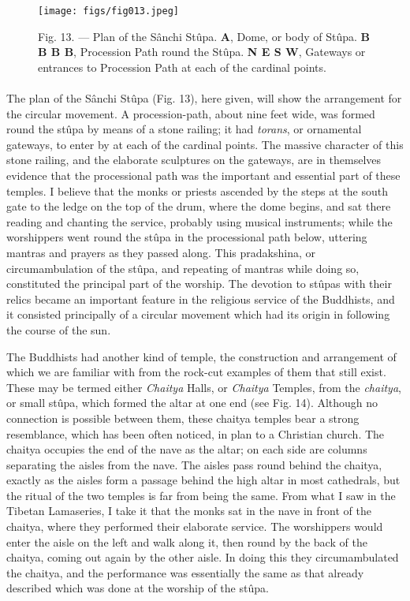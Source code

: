 \documentclass[a4paper, 11pt, oneside, polutonikogreek, english]{article}
\begin{document}
\begin{figure}[H]
\centering
\texttt{[image: figs/fig013.jpeg]}
\caption[Fig. 13. --- Plan of the Sânchi Stûpa.]{Fig. 13. --- Plan of the Sânchi Stûpa. \textbf{A}, Dome, or body of Stûpa. \textbf{B B B B}, Procession Path round the Stûpa. \textbf{N E S W}, Gateways or entrances to Procession Path at each of the cardinal points.}
\end{figure}
\paragraph{}
The plan of the Sânchi Stûpa (Fig. 13), here given, will show the arrangement for the circular movement. A procession-path, about nine feet wide, was formed round the stûpa by means of a stone railing; it had \emph{torans}, or ornamental gateways, to enter by at each of the cardinal points. The massive character of this stone railing, and the elaborate sculptures on the gateways, are in themselves evidence that the processional path was the important and essential part of these temples. I believe that the monks or priests ascended by the steps at the south gate to the ledge on the top of the drum, where the dome begins, and sat there reading and chanting the service, probably using musical instruments; while the worshippers went round the stûpa in the processional path below, uttering mantras and prayers as they passed along. This pradakshina, or circumambulation of the stûpa, and repeating of mantras while doing so, constituted the principal part of the worship. The devotion to stûpas with their relics became an important feature in the religious service of the Buddhists, and it consisted principally of a circular movement which had its origin in following the course of the sun.

The Buddhists had another kind of temple, the construction and arrangement of which we are familiar with from the rock-cut examples of them that still exist. These may be termed either \emph{Chaitya} Halls, or \emph{Chaitya} Temples, from the \emph{chaitya}, or small stûpa, which formed the altar at one end (see Fig. 14). Although no connection is possible between them, these chaitya temples bear a strong resemblance, which has been often noticed, in plan to a Christian church. The chaitya occupies the end of the nave as the altar; on each side are columns separating the aisles from the nave. The aisles pass round behind the chaitya, exactly as the aisles form a passage behind the high altar in most cathedrals, but the ritual of the two temples is far from being the same. From what I saw in the Tibetan Lamaseries, I take it that the monks sat in the nave in front of the chaitya, where they performed their elaborate service. The worshippers would enter the aisle on the left and walk along it, then round by the back of the chaitya, coming out again by the other aisle. In doing this they circumambulated the chaitya, and the performance was essentially the same as that already described which was done at the worship of the stûpa.
\end{document}
